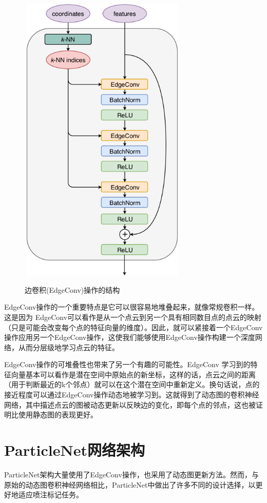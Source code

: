 \begin{figure}[H]
 \centering
 \caption{边卷积(EdgeConv)操作的结构\cite{PaticleNet}}
 \includegraphics[height=14cm, width=8cm]{pictures/edgeconv.png}
 \label{fig:4.1}
\end{figure}

EdgeConv操作的一个重要特点是它可以很容易地堆叠起来，就像常规卷积一样。这是因为 EdgeConv可以看作是从一个点云到另一个具有相同数目点的点云的映射（只是可能会改变每个点的特征向量的维度）。因此，就可以紧接着一个EdgeConv操作应用另一个EdgeConv操作，这使我们能够使用EdgeConv操作构建一个深度网络，从而分层级地学习点云的特征。

EdgeConv操作的可堆叠性也带来了另一个有趣的可能性。EdgeConv 学习到的特征向量基本可以看作是潜在空间中原始点的新坐标，这样的话，点云之间的距离（用于判断最近的k个邻点）就可以在这个潜在空间中重新定义。换句话说，点的接近程度可以通过EdgeConv操作动态地被学习到。这就得到了动态图的卷积神经网络\cite{dynamic_graph}，其中描述点云的图被动态更新以反映边的变化，即每个点的邻点，这也被证明比使用静态图的表现更好\cite{dynamic_graph}。

\section{ParticleNet网络架构}
ParticleNet架构大量使用了EdgeConv操作，也采用了动态图更新方法。然而，与原始的动态图卷积神经网络相比，ParticleNet中做出了许多不同的设计选择，以更好地适应喷注标记任务。

